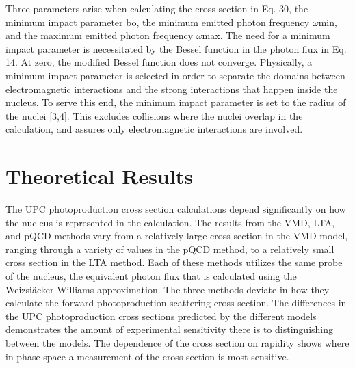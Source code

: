     Three parameters arise when calculating the cross-section in Eq.
    30, the minimum impact parameter bo, the minimum emitted photon frequency $\omega$min, and the maximum emitted photon frequency $\omega$max.
    The need for a minimum impact parameter is necessitated by the Bessel function in the photon flux in Eq.
    14.
    At zero, the modified Bessel function does not converge.
    Physically, a minimum impact parameter is selected in order to separate the domains between electromagnetic interactions and the strong interactions that happen inside the nucleus.
    To serve this end, the minimum impact parameter is set to the radius of the nuclei [3,4].
    This excludes collisions where the nuclei overlap in the calculation, and assures only electromagnetic interactions are involved.

  \section{Theoretical Results}
  The UPC photoproduction cross section calculations depend significantly on 
    how the nucleus is represented in the calculation. 
  The results from the VMD, LTA, and pQCD methods vary from a relatively 
    large cross section in the VMD model, ranging through a variety of values
    in the pQCD method, to a relatively small cross section in the LTA method. 
  Each of these methods utilizes the same probe of the nucleus, the equivalent 
    photon flux that is calculated using the Weizsi\"{a}cker-Williams approximation. 
  The three methods deviate in how they calculate the forward photoproduction
    scattering cross section.
  The differences in the UPC photoproduction cross sections predicted by the 
    different models demonstrates the amount of experimental sensitivity there 
    is to distinguishing between the models. 
  The dependence of the cross section on rapidity shows where in phase space 
    a measurement of the cross section is most sensitive.
   
